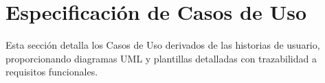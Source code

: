 \section{Especificación de Casos de Uso}

Esta sección detalla los Casos de Uso derivados de las historias de usuario, proporcionando
diagramas UML y plantillas detalladas con trazabilidad a requisitos funcionales.









